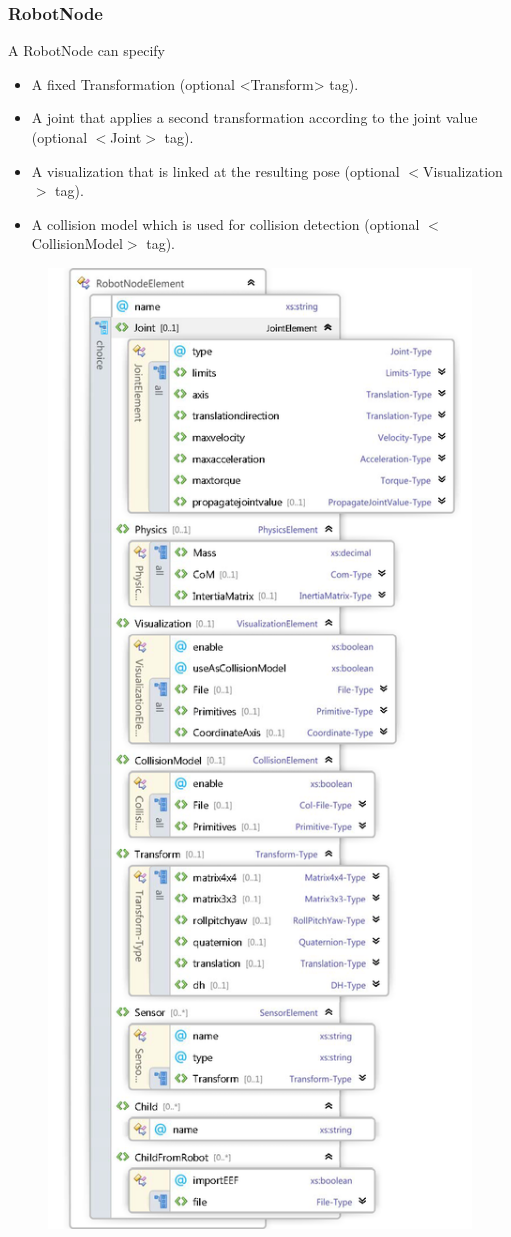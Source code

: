 \documentclass{book}
\begin{document}
\subsubsection{RobotNode}
A RobotNode can specify
\begin{itemize}
\item A fixed Transformation (optional <Transform> tag). 
\item A joint that applies a second transformation according to the joint value (optional $<$Joint$>$ tag). 
\item A visualization that is linked at the resulting pose (optional $<$Visualization$>$ tag). 
\item A collision model which is used for collision detection (optional $<$CollisionModel$>$ tag). 
\end{itemize}
\begin{figure}[H]
	\centering
	\includegraphics[scale = 0.3]{Xsd_RobotNode2}

\end{figure}
\end{document}

